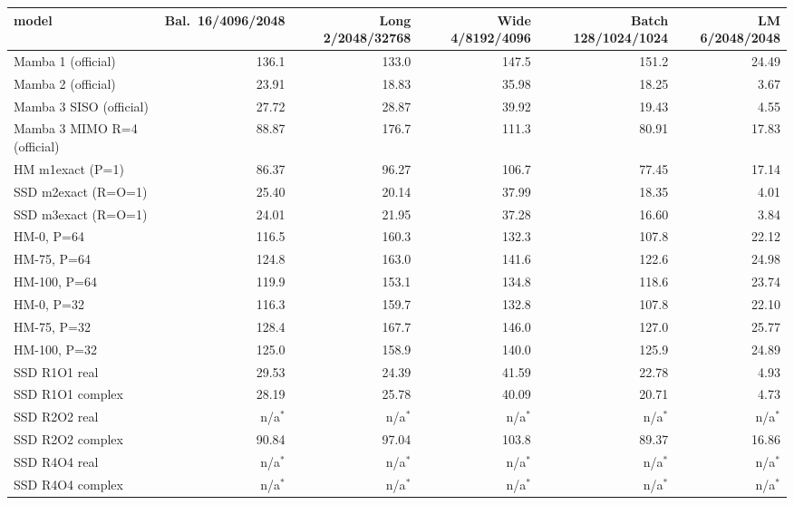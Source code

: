 \begin{tabular}{l r r r r r }
\toprule
model & Bal.\ 16/4096/2048 & Long 2/2048/32768 & Wide 4/8192/4096 & Batch 128/1024/1024 & LM 6/2048/2048 \\
\midrule
Mamba 1 (official) & 136.1 & 133.0 & 147.5 & 151.2 & 24.49 \\
Mamba 2 (official) & 23.91 & 18.83 & 35.98 & 18.25 & 3.67 \\
Mamba 3 SISO (official) & 27.72 & 28.87 & 39.92 & 19.43 & 4.55 \\
Mamba 3 MIMO R=4 (official) & 88.87 & 176.7 & 111.3 & 80.91 & 17.83 \\
HM m1exact (P=1) & 86.37 & 96.27 & 106.7 & 77.45 & 17.14 \\
SSD m2exact (R=O=1) & 25.40 & 20.14 & 37.99 & 18.35 & 4.01 \\
SSD m3exact (R=O=1) & 24.01 & 21.95 & 37.28 & 16.60 & 3.84 \\
HM-0, P=64 & 116.5 & 160.3 & 132.3 & 107.8 & 22.12 \\
HM-75, P=64 & 124.8 & 163.0 & 141.6 & 122.6 & 24.98 \\
HM-100, P=64 & 119.9 & 153.1 & 134.8 & 118.6 & 23.74 \\
HM-0, P=32 & 116.3 & 159.7 & 132.8 & 107.8 & 22.10 \\
HM-75, P=32 & 128.4 & 167.7 & 146.0 & 127.0 & 25.77 \\
HM-100, P=32 & 125.0 & 158.9 & 140.0 & 125.9 & 24.89 \\
SSD R1O1 real & 29.53 & 24.39 & 41.59 & 22.78 & 4.93 \\
SSD R1O1 complex & 28.19 & 25.78 & 40.09 & 20.71 & 4.73 \\
SSD R2O2 real & n/a$^\ast$ & n/a$^\ast$ & n/a$^\ast$ & n/a$^\ast$ & n/a$^\ast$ \\
SSD R2O2 complex & 90.84 & 97.04 & 103.8 & 89.37 & 16.86 \\
SSD R4O4 real & n/a$^\ast$ & n/a$^\ast$ & n/a$^\ast$ & n/a$^\ast$ & n/a$^\ast$ \\
SSD R4O4 complex & n/a$^\ast$ & n/a$^\ast$ & n/a$^\ast$ & n/a$^\ast$ & n/a$^\ast$ \\
\bottomrule
\end{tabular}
